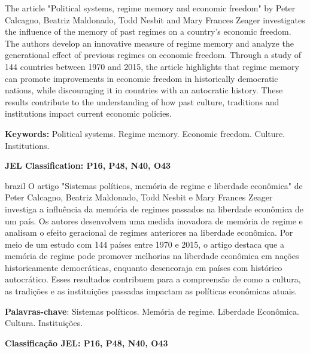 \documentclass[
	article,
	12pt,
	oneside,
	a4paper,
	english,
	brazil,
	sumario=tradicional
]{abntex2}
\begin{document}
\frenchspacing

\maketitle
{}

	\begin{resumoumacoluna}
	\noindent
	The article "Political systems, regime memory and economic freedom" by Peter Calcagno, Beatriz Maldonado, Todd Nesbit and Mary Frances Zeager investigates the influence of the memory of past regimes on a country's economic freedom. The authors develop an innovative measure of regime memory and analyze the generational effect of previous regimes on economic freedom. Through a study of 144 countries between 1970 and 2015, the article highlights that regime memory can promote improvements in economic freedom in historically democratic nations, while discouraging it in countries with an autocratic history. These results contribute to the understanding of how past culture, traditions and institutions impact current economic policies.
	
	\textbf{Keywords:} Political systems. Regime memory. Economic freedom. Culture. Institutions.
	
	\textbf{JEL Classification: P16, P48, N40, O43}
	\end{resumoumacoluna}

\newpage

\renewcommand{\resumoname}{Resumo}
\begin{resumoumacoluna}
\begin{otherlanguage*}{brazil}
   \noindent 
   O artigo "Sistemas políticos, memória de regime e liberdade econômica" de Peter Calcagno, Beatriz Maldonado, Todd Nesbit e Mary Frances Zeager investiga a influência da memória de regimes passados na liberdade econômica de um país. Os autores desenvolvem uma medida inovadora de memória de regime e analisam o efeito geracional de regimes anteriores na liberdade econômica. Por meio de um estudo com 144 países entre 1970 e 2015, o artigo destaca que a memória de regime pode promover melhorias na liberdade econômica em nações historicamente democráticas, enquanto desencoraja em países com histórico autocrático. Esses resultados contribuem para a compreensão de como a cultura, as tradições e as instituições passadas impactam as políticas econômicas atuais.   
   
   \textbf{Palavras-chave}: Sistemas políticos. Memória de regime. Liberdade Econômica. Cultura. Instituições.
   
   \textbf{Classificação JEL: P16, P48, N40, O43}
 \end{otherlanguage*}  
\end{resumoumacoluna}

\newpage


\textual



\renewcommand{\refname}{Referências}


\end{document}
